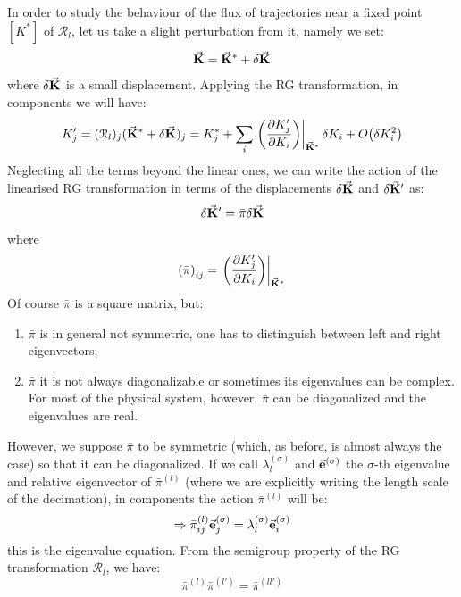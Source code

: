 \documentclass[../main/main.tex]{subfiles}
\begin{document}
In order to study the behaviour of the flux of trajectories near a fixed point \( [K^*] \) of \( \mathcal{R}_l \), let us take a slight perturbation from it, namely we set:
\begin{equation}
  \va{K} = \va{K}^* + \delta \va{K}
\end{equation}
where \( \delta \va{K} \) is a small displacement. Applying the RG transformation, in components we will have:
\begin{equation*}
  K'_j = (\mathcal{R}_l)_j (\va{K}^*+ \delta \va{K} )_j
= K^*_j + \sum_{i}^{} \eval{\qty(\pdv{K_j'}{K_i} )}_{\va{K}^*} \delta K_i + O \qty(\delta K_i^2)
\end{equation*}
Neglecting all the terms beyond the linear ones, we can write the action of the linearised RG transformation in terms of the displacements \( \delta \va{K} \) and
\( \delta \va{K}' \) as:
\begin{equation}
  \delta \va{K}' = \bar{\pi } \delta \va{K}
\end{equation}
where
\begin{equation}
  \qty(\bar{\pi } )_{ij} = \eval{\qty(\pdv{K_j'}{K_i} )}_{\va{K}^*}
\end{equation}
Of course \( \bar{\pi } \) is a square matrix, but:
\begin{enumerate}
\item \( \bar{\pi }  \) is in general not symmetric, one has to distinguish between left and right eigenvectors;
\item \( \bar{\pi }  \) it is not always diagonalizable or sometimes its eigenvalues can be complex. For most of the physical system, however, \( \bar{\pi }  \) can be diagonalized and the eigenvalues are real.
\end{enumerate}
However, we suppose \( \bar{\pi } \) to be symmetric (which, as before, is almost always the case) so that it can be diagonalized. If we call \( \lambda _l^{(\sigma)} \) and \( \va{e}^{(\sigma )} \) the \( \sigma  \)-th  eigenvalue and relative eigenvector of \( \bar{\pi }^{(l)} \)  (where we are explicitly writing the length scale of the decimation), in components the action \(\bar{\pi }^{(l)}  \) will be:
\begin{equation}
  \Rightarrow \bar{\pi }^{(l)}_{ij} \va{e}^{(\sigma )}_j = \lambda _l^{(\sigma )} \va{e}_i ^{(\sigma )}
\end{equation}
this is the eigenvalue equation. From the semigroup property of the RG transformation \( \mathcal{R}_l \), we have:
\begin{equation*}
  \bar{\pi }^{(l)} \bar{\pi }^{(l')} = \bar{\pi }^{(ll')}
\end{equation*}
\end{document}

